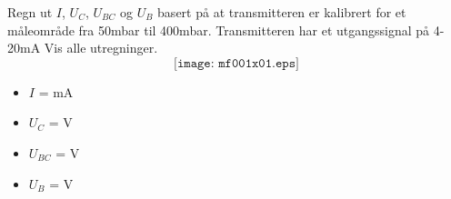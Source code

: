 

Regn ut $I$, $U_{C}$, $U_{BC}$ og  $U_{B}$ basert på at transmitteren er kalibrert for et måleområde fra 50mbar til 400mbar. Transmitteren har et utgangssignal på 4-20mA 
Vis alle utregninger. 
$$\texttt{[image: mf001x01.eps]}$$








\begin{itemize}
\item{} $I$ =  mA
\vskip 10pt
\item{} $U_{C}$ =  V 
\vskip 10pt
\item{} $U_{BC}$ =  V 
\vskip 10pt
\item{} $U_{B}$ =  V 
\end{itemize}











